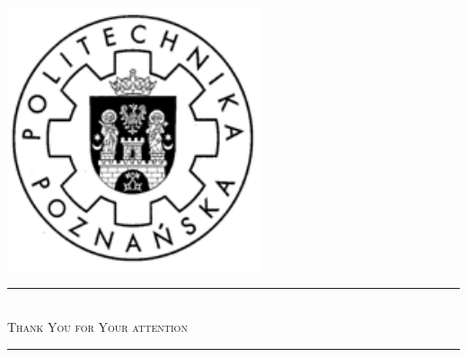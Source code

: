 \documentclass[hyperref={pdfpagelabels=true},11pt,compress,trans]{beamer}
\begin{document}
{
 \logo
{
  \includegraphics[keepaspectratio,height=0.2\textheight]{images/put_logo.pdf} \hspace*{3.5em}
}

\begin{frame}{}
  \rmfamily\Large
  \begin{center}
      \par\noindent\ignorespaces\rule{0.9\textwidth}{0.05em} \\
      \textsc{Thank You for Your attention} \\ \vspace{-\parskip}
      \rule{0.9\textwidth}{0.05em}
  \end{center}
\end{frame}

}
\end{document}
